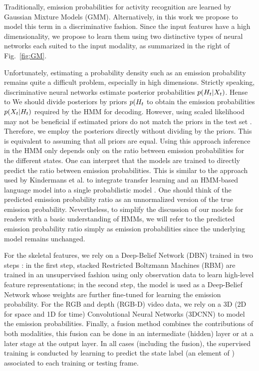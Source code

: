 Traditionally, emission probabilities for activity recognition are learned by Gaussian Mixture Models (GMM).
%
Alternatively, in this work we propose to model this term in a discriminative fashion.
Since the input features have a high dimensionality,
we propose to learn them using two distinctive types of neural networks each suited to the input modality,
as summarized in the right of Fig.~\ref{fig:GM}.
%

Unfortunately, estimating a probability density such as an emission probability remains quite a difficult problem, especially in high dimensions.
%
Strictly speaking, discriminative neural networks estimate posterior probabilities $p(H_t | X_t)$. Hense to We should divide posteriors by priors  $p(H_t$ to obtain the emission probabilities $p(X_t|H_t )$  required by the HMM for decoding. However, using scaled likelihood may not be beneficial if estimated priors do not match the priors in the test set \cite{morris2001multi}. Therefore, we employ the posteriors directly without dividing by the priors. This is equivalent to assuming that all priors are equal.
%
Using this approach inference in the HMM only depends only on the ratio between emission probabilities for the different states. One can interpret that the models are trained to directly predict the ratio between emission probabilities. This is similar to the approach used by Kindermans et al. to integrate transfer learning and an HMM-based language model into a single probabilistic model \cite{Kindermans2012a}.
One should think of the predicted emission probability ratio as an unnormalized version of the true emission probability. Nevertheless, to simplify the discussion of our models for readers with a basic understanding of HMMs, we will refer to the predicted emission probability ratio simply as emission probabilities since the underlying model remains unchanged.


For  the skeletal features, we rely on a Deep-Belief Network (DBN) trained in two steps \cite{salakhutdinov2009learning}:
in the first step,  stacked Restricted Boltzmann Machines (RBM) are trained in an unsupervised fashion using only observation data
to learn  high-level feature representations;
in the second step, the model is used as a Deep-Belief Network whose weights are further fine-tuned
for learning the emission probability.
%
For the RGB and depth (RGB-D) video data, we rely on a 3D (2D for space and 1D for time)
Convolutional Neural Networks (3DCNN) to model the emission probabilities.
%
Finally, a fusion method combines the contributions of both modalities, this fusion can be done in an intermediate (hidden) layer or at a later stage at the output layer.
%
In all cases (including the fusion), the supervised training is conducted by learning to
predict the state label (an element of \finiteset) associated to each training or testing frame.


